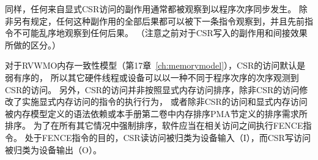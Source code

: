 同样，任何来自显式CSR访问的副作用通常都被观察到以程序次序同步发生。
除非另有规定，任何这种副作用的全部后果都可以被下一条指令观察到，并且先前指令不可能乱序地观察到任何后果。
（注意之前对于CSR写入的副作用和间接效果所做的区分。）

对于RVWMO内存一致性模型（第17章~\ref{ch:memorymodel}），CSR的访问默认是弱有序的，
所以其它硬件线程或设备可以以一种不同于程序次序的次序观测到CSR的访问。
另外，CSR的访问并非按照显式内存访问排序，除非CSR的访问修改了实施显式内存访问的指令的执行行为，
或者除非CSR的访问和显式内存访问被内存模型定义的语法依赖或本手册第二卷中内存排序PMA节定义的排序需求所排序。
为了在所有其它情况中强制排序，软件应当在相关访问之间执行FENCE指令。
处于FENCE指令的目的，CSR读访问被归类为设备输入（I），而CSR写访问被归类为设备输出（O）。


